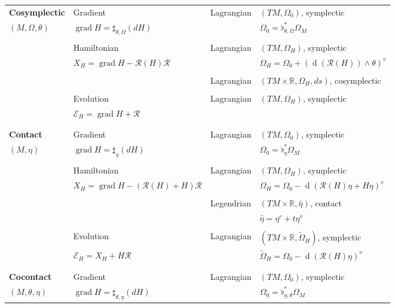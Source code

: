 \documentclass[12pt]{article}
\newcommand{\grad}{\operatorname{grad}}
\renewcommand{\d}{\operatorname{d}}
\begin{document}
\begin{table}[ht]
{\begin{tabular}{llll}
     \textbf{Cosymplectic} & Gradient & Lagrangian & $(TM, \Omega_0)$, symplectic\\
     $(M, \Omega, \theta)$&  $\grad H = \sharp_{\theta, \Omega}(dH)$ && $\Omega_0 = \flat_{\theta, \Omega}^* \Omega_M$\\
     [+0.2ex]\\
     & Hamiltonian & Lagrangian & $(TM, \Omega_H)$, symplectic\\ & $X_H = \grad H - \mathcal{R}(H) \mathcal{R}$ && $\Omega_H = \Omega_0 + (\d(\mathcal{R}(H)) \wedge \theta)^v$\\
     [+0.2ex]\\
     && Lagrangian & $(TM \times \mathbb{R},\Omega_H,ds)$, cosymplectic\\
     [+0.2ex]\\
     & Evolution & Lagrangian & $(TM, \Omega_H)$, symplectic\\ & $\mathcal{E}_H = \grad H + \mathcal{R}$\\
     [+0.3 ex]\\
     \hline\\
     \textbf{Contact} & Gradient & Lagrangian & $(TM, \Omega_0)$, symplectic\\ $(M, \eta)$& $\grad H = \sharp_{\eta}(dH)$ && $\Omega_0 = \flat_\eta ^*\Omega_M$ \\
     [+0.2ex]\\
     & Hamiltonian & Lagrangian & $(TM, \Omega_H)$, symplectic \\ &$X_H = \grad H - (\mathcal{R}(H) + H)\mathcal{R}$ && $\Omega_H = \Omega_0 - \d(\mathcal{R}(H) \eta + H \eta) ^v$ \\ 
     [+0.2ex]\\
     && Legendrian & $(TM \times \mathbb{R}, \hat{\eta})$, contact\\
     &&& $\hat{\eta} = \eta^c + t \eta^v$\\
     [+0.2ex]\\
     & Evolution & Lagrangian & $(TM\times \mathbb{R}, \widetilde \Omega_H)$, symplectic\\ & $\mathcal{E}_H = X_H + H \mathcal{R}$  && $\widetilde \Omega_H = \Omega_0 - \d(\mathcal{R}(H) \eta)^v$\\
     [+0.3ex]\\
     \hline\\
     \textbf{Cocontact} & Gradient & Lagrangian & $(TM, \Omega_0)$, symplectic\\
     $(M, \theta, \eta)$& $\grad H = \sharp_{\theta, \eta}(dH)$ && $\Omega_0 = \flat_{\eta, \theta}^* \Omega_M$\\

\end{tabular}}
\end{table}
\end{document}
